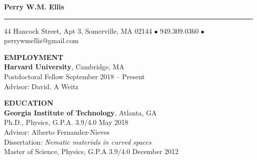 \documentclass[10pt]{article}
\newcommand{\HRule}{\rule{\linewidth}{0.5mm}}
\newenvironment{changemargin}[2]{%
  \list{}{\rightmargin#2\leftmargin#1
    \parsep=0pt\topsep=1pt\partopsep=0pt}
\item[]} {\endlist}
\newenvironment{indentmore}{\begin{changemargin}{10pt}{0cm}}{\end{changemargin}}
\begin{document}
\begin{center}

\textbf{\Large Perry W.M. Ellis}
\HRule

44 Hancock Street, Apt 3, Somerville, MA 02144 $\bullet$ 949.309.0360 $\bullet$ perrywmellis@gmail.com

\end{center}

\vspace{10pt}
\textbf{\large EMPLOYMENT} \\
\textbf{Harvard University}, Cambridge, MA\\
\hspace*{10pt}Postdoctoral Fellow \hfill September 2018 -- Present\\
\hspace*{10pt}Advisor: David. A Weitz
\vspace{10pt}

\textbf{\large EDUCATION} \\
\textbf{Georgia Institute of Technology}, Atlanta, GA\\
\hspace*{10pt}Ph.D., Physics, G.P.A. 3.9/4.0 \hfill May 2018\\
\hspace*{10pt}Advisor: Alberto Fernandez-Nieves\\
\hspace*{10pt}Dissertation: \emph{Nematic materials in curved spaces}\\

\hspace*{10pt}Master of Science, Physics, G.P.A 3.9/4.0 \hfill December 2012
\end{document}
